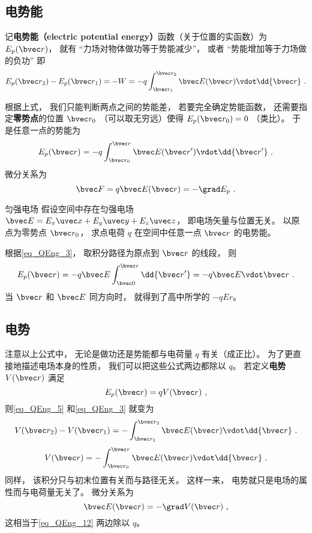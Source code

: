 \subsection{电势能}
记\textbf{电势能（electric potential energy）}函数（关于位置的实函数）为 $E_p(\bvec r)$， 就有 “力场对物体做功等于势能减少”， 或者 “势能增加等于力场做的负功” 即
\begin{equation}\label{eq_QEng_5}
E_p(\bvec r_2) - E_p(\bvec r_1) = -W = -q \int_{\bvec r_1}^{\bvec r_2} \bvec E(\bvec r) \vdot \dd{\bvec r}~.
\end{equation}

根据上式， 我们只能判断两点之间的势能差， 若要完全确定势能函数， 还需要指定\textbf{零势点}的位置 $\bvec r_0$ （可以取无穷远）使得 $E_p(\bvec r_0) = 0$ （类比）。 于是任意一点的势能为
\begin{equation}\label{eq_QEng_3}
E_p(\bvec r) = -q \int_{\bvec r_0}^{\bvec r} \bvec E(\bvec r') \vdot \dd{\bvec r'}~.
\end{equation}
微分关系为
\begin{equation}\label{eq_QEng_12}
\bvec F = q\bvec E(\bvec r) = -\grad E_p~.
\end{equation}

\begin{example}{匀强电场}
假设空间中存在匀强电场 $\bvec E = E_x \uvec x + E_y \uvec y + E_z \uvec z$， 即电场矢量与位置无关。 以原点为零势点 $\bvec r_0$， 求点电荷 $q$ 在空间中任意一点 $\bvec r$ 的电势能。

根据\autoref{eq_QEng_3}， 取积分路径为原点到 $\bvec r$ 的线段， 则
\begin{equation}
E_p(\bvec r) = -q \bvec E \int_{\bvec 0}^{\bvec r} \dd{\bvec r'} = -q \bvec E \vdot \bvec r~.
\end{equation}
当 $\bvec r$ 和 $\bvec E$ 同方向时， 就得到了高中所学的 $-qEr$。
\end{example}

\subsection{电势}
注意以上公式中， 无论是做功还是势能都与电荷量 $q$ 有关（成正比）。 为了更直接地描述电场本身的性质， 我们可以把这些公式两边都除以 $q$。 若定义\textbf{电势} $V(\bvec r)$ 满足
\begin{equation}\label{eq_QEng_14}
E_p(\bvec r) = q V(\bvec r)~,
\end{equation}
则\autoref{eq_QEng_5} 和\autoref{eq_QEng_3} 就变为
\begin{equation}\label{eq_QEng_1}
V(\bvec r_2) - V(\bvec r_1) = - \int_{\bvec r_1}^{\bvec r_2} \bvec E(\bvec r) \vdot \dd{\bvec r}~.
\end{equation}
\begin{equation}\label{eq_QEng_9}
V(\bvec r) = -\int_{\bvec r_0}^{\bvec r} \bvec E(\bvec r) \vdot \dd{\bvec r}~.
\end{equation}
同样， 该积分只与初末位置有关而与路径无关。 这样一来， 电势就只是电场的属性而与电荷量无关了。 微分关系为
\begin{equation}\label{eq_QEng_13}
\bvec E(\bvec r) = -\grad V(\bvec r)~,
\end{equation}
这相当于\autoref{eq_QEng_12} 两边除以 $q$。

